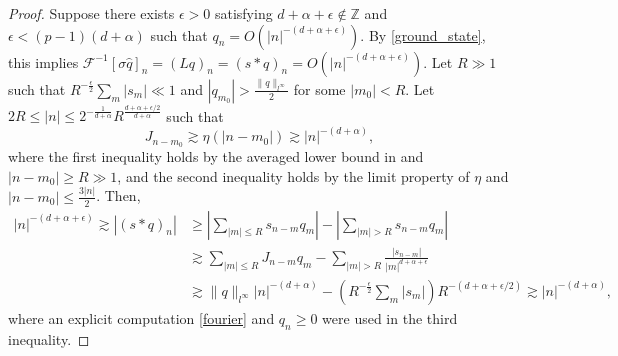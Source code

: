 \documentclass[10pt,a4paper]{amsart}
\begin{document}
\begin{proof}
Suppose there exists $\epsilon>0$ satisfying $d+\alpha + \epsilon \notin \mathbb{Z}$ and $\epsilon < (p-1)(d+\alpha)$ such that $q_n = O(|n|^{-(d+\alpha+\epsilon)})$. By \eqref{ground_state}, this implies $\mathcal{F}^{-1}[\sigma \widehat{q}]_{n} = (Lq)_{n} = (s \ast q)_{n} = O(|n|^{-(d+\alpha+\epsilon)})$. Let $R \gg 1$ such that $R^{-\frac{\epsilon}{2}}\sum\limits_{m} |s_m| \ll 1$ and $|q_{m_0}| > \frac{\| q \|_{l^\infty}}{2}$ for some $|m_0| < R$. Let $2R \leq |n| \leq 2^{-\frac{1}{d+\alpha}} R^{\frac{d+\alpha+\epsilon/2}{d+\alpha}}$ such that
\begin{equation*}
J_{n-m_0} \gtrsim \eta(|n-m_0|) \gtrsim |n|^{-(d+\alpha)},    
\end{equation*}
where the first inequality holds by the averaged lower bound in  and $|n-m_0| \geq R \gg 1$, and the second inequality holds by the limit property of $\eta$ and $|n-m_0| \leq \frac{3 |n|}{2}$. Then,
\begin{equation}
\begin{split}
    |n|^{-(d+\alpha+\epsilon)}\gtrsim|(s \ast q)_n| &\geq \left|\sum_{|m| \leq R} s_{n-m} q_m\right| - \left|\sum_{|m| > R} s_{n-m} q_m\right|\\
    &\gtrsim \sum_{|m| \leq R} J_{n-m} q_m - \sum_{|m| > R} \frac{|s_{n-m}|}{|m|^{d+\alpha+\epsilon}}\\
    &\gtrsim \| q \|_{l^\infty} |n|^{-(d+\alpha)} - (R^{-\frac{\epsilon}{2}} \sum_{m} |s_m|) R^{-(d+\alpha+\epsilon/2)} \gtrsim |n|^{-(d+\alpha)},
\end{split}
\end{equation}
where an explicit computation \eqref{fourier} and $q_n \geq 0$ were used in the third inequality.    
\end{proof}
\end{document}
